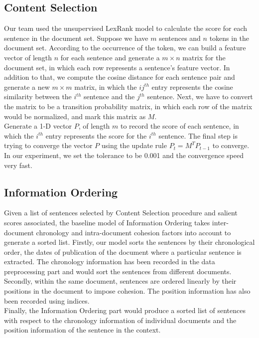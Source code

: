 \documentclass[11pt]{article}
\begin{document}
\subsection{Content Selection}

Our team used the unsupervised LexRank model to calculate the score for each sentence in the document set. Suppose we have $m$ sentences and $n$ tokens in the document set. According to the occurrence of the token, we can build a feature vector of length $n$ for each sentence and generate a $m\times n$ matrix for the document set, in which each row represents a sentence's feature vector. In addition to that, we compute the cosine distance for each sentence pair and generate a new $m\times m$ matrix, in which the $ij^{th}$ entry represents the cosine similarity between the $i^{th}$ sentence and the $j^{th}$ sentence. Next, we have to convert the matrix to be a transition probability matrix, in which each row of the matrix would be normalized, and mark this matrix as $M$. \\
\indent
Generate a 1-D vector $P$,  of length $m$ to record the score of each sentence, in which the $i^{th}$ entry represents the score for the $i^{th}$ sentence. The final step is trying to converge the vector $P$ using the update rule $P_t = M^T P_{t-1}$ to converge. In our experiment, we set the tolerance to be 0.001 and the convergence speed very fast.

\subsection{Information Ordering}

Given a list of sentences selected by Content Selection procedure and salient scores associated, the baseline model of Information Ordering takes inter-document chronology and intra-document cohesion factors into account to generate a sorted list. Firstly, our model sorts the sentences by their chronological order, the dates of publication of the document where a particular sentence is extracted. The chronology information has been recorded in the data preprocessing part and would sort the sentences from different documents. Secondly, within the same document, sentences are ordered linearly by their positions in the document to impose cohesion. The position information has also been recorded using indices.\\
\indent
Finally, the Information Ordering part would produce a sorted list of sentences with respect to the chronology information of individual documents and the position information of the sentence in the context. 
\end{document}
